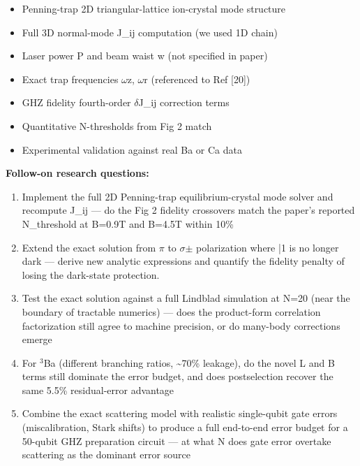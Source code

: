 \begin{itemize}[leftmargin=1.4em,itemsep=0.2em,topsep=0.2em]
\item Penning-trap 2D triangular-lattice ion-crystal mode structure
\item Full 3D normal-mode J\_ij computation (we used 1D chain)
\item Laser power P and beam waist w (not specified in paper)
\item Exact trap frequencies $\omega$z, $\omega$r (referenced to Ref [20])
\item GHZ fidelity fourth-order $\delta$J\_ij correction terms
\item Quantitative N-thresholds from Fig 2 match
\item Experimental validation against real Ba or Ca data
\end{itemize}\noindent\textbf{Follow-on research questions:}
\begin{enumerate}[leftmargin=1.6em,itemsep=0.2em,topsep=0.2em,label=Q\arabic*.]
\item Implement the full 2D Penning-trap equilibrium-crystal mode solver and recompute J\_ij --- do the Fig 2 fidelity crossovers match the paper's reported N\_threshold at B=0.9T and B=4.5T within 10\%
\item Extend the exact solution from $\pi$ to $\sigma$$\pm$ polarization where |1 is no longer dark --- derive new analytic expressions and quantify the fidelity penalty of losing the dark-state protection.
\item Test the exact solution against a full Lindblad simulation at N=20 (near the boundary of tractable numerics) --- does the product-form correlation factorization still agree to machine precision, or do many-body corrections emerge
\item For $^3$Ba (different branching ratios, \textasciitilde{}70\% leakage), do the novel L and B terms still dominate the error budget, and does postselection recover the same 5.5\% residual-error advantage
\item Combine the exact scattering model with realistic single-qubit gate errors (miscalibration, Stark shifts) to produce a full end-to-end error budget for a 50-qubit GHZ preparation circuit --- at what N does gate error overtake scattering as the dominant error source
\end{enumerate}

